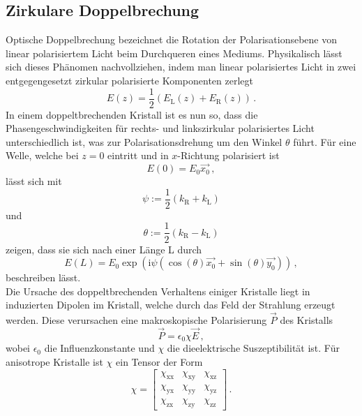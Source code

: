 \subsection{Zirkulare Doppelbrechung}
Optische Doppelbrechung bezeichnet die Rotation der Polarisationsebene von linear polarisiertem Licht beim Durchqueren eines Mediums. Physikalisch lässt sich dieses Phänomen nachvollziehen, indem man linear polarisiertes Licht in zwei entgegengesetzt zirkular polarisierte Komponenten zerlegt
\begin{equation}
E(z)=\frac{1}{2}(E_\text{L}(z)+E_\text{R}(z))\,.
\end{equation}
In einem doppeltbrechenden Kristall ist es nun so, dass die Phasengeschwindigkeiten für rechts- und linkszirkular polarisiertes Licht unterschiedlich ist, was zur Polarisationsdrehung um den Winkel $\theta$ führt. Für eine Welle, welche bei $z=0$ eintritt und in $x$-Richtung polarisiert ist
\begin{equation}
  E(0)=E_0\vec{x_0}\,,
\end{equation}
lässt sich mit
\begin{equation}
  \psi:=\frac{1}{2}\left(k_\text{R}+k_\text{L}\right)
\end{equation}
und
\begin{equation}
\theta:=\frac{1}{2}\left(k_\text{R}-k_\text{L}\right)
\label{eq:theta}
\end{equation}
zeigen, dass sie sich nach einer Länge L durch
\begin{equation}
E(L)=E_0 \exp{\left(\text{i}\psi\left(\cos(\theta)\vec{x_0}+\sin(\theta)\vec{y_0}\right)\right)}\,,
\end{equation}
beschreiben lässt.\\
Die Ursache des doppeltbrechenden Verhaltens einiger Kristalle liegt in induzierten Dipolen im Kristall, welche durch das Feld der Strahlung erzeugt werden. Diese verursachen eine makroskopische Polarisierung $\vec{P}$ des Kristalls
\begin{equation}
\vec{P}=\epsilon_0\chi\vec{E}\,,
\end{equation}
wobei $\epsilon_0$ die Influenzkonstante und $\chi$ die dieelektrische Suszeptibilität ist.
Für anisotrope Kristalle ist $\chi$ ein Tensor der Form
\begin{equation}
  \chi=
  \left[ {\begin{array}{ccc}
   \chi_\text{xx} & \chi_\text{xy} & \chi_\text{xz}\\
   \chi_\text{yx} & \chi_\text{yy} & \chi_\text{yz}\\
   \chi_\text{zx} & \chi_\text{zy} &\chi_\text{zz}
  \end{array} } \right]\,.
\end{equation}

